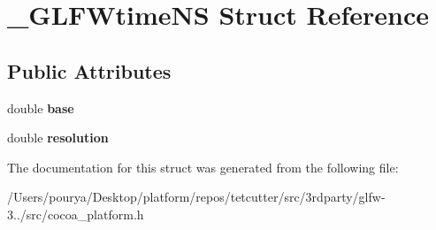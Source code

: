 \hypertarget{struct__GLFWtimeNS}{}\section{\+\_\+\+G\+L\+F\+Wtime\+N\+S Struct Reference}
\label{struct__GLFWtimeNS}
\subsection*{Public Attributes}
\begin{DoxyCompactItemize}
\item 
\hypertarget{struct__GLFWtimeNS_a19f0c76fd0dc5513c158d6726c044744}{}double {\bfseries base}\label{struct__GLFWtimeNS_a19f0c76fd0dc5513c158d6726c044744}

\item 
\hypertarget{struct__GLFWtimeNS_a41cb14a2501b3e80395dd1c261719505}{}double {\bfseries resolution}\label{struct__GLFWtimeNS_a41cb14a2501b3e80395dd1c261719505}

\end{DoxyCompactItemize}


The documentation for this struct was generated from the following file\+:\begin{DoxyCompactItemize}
\item 
/\+Users/pourya/\+Desktop/platform/repos/tetcutter/src/3rdparty/glfw-\/3../src/cocoa\+\_\+platform.\+h\end{DoxyCompactItemize}
